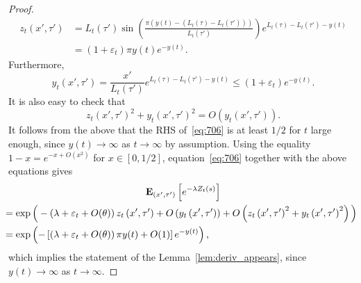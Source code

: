 \documentclass[AHL,Unicode,longabstracts,published]{cedram}
\newcommand*\eps{\varepsilon}
\newcommand*\E{\mathbf{E}}
\newcommand{\1} {\mathds{1}}
\renewcommand*\to{\rightarrow}
\begin{document}
\begin{proof}
\begin{align*}
z_t(x',\tau') &= L_t(\tau') \sin\left(\frac{\pi (y(t) - (L_t(\tau) - L_t(\tau')))}{L_t(\tau')}\right) e^{L_t(\tau) - L_t(\tau') - y(t)} \\
&= (1+\eps_t)\pi y(t)e^{-y(t)}.
\end{align*}
Furthermore,
\[
y_t\left(x',\tau'\right) = \frac{x'}{L_t(\tau')} e^{L_t(\tau) - L_t(\tau') - y(t)} \le (1 + \eps_t) e^{-y(t)}.
\]
It is also easy to check that
\[
z_t\left(x',\tau'\right)^2 + y_t\left(x',\tau'\right)^2 = O\left(y_t\left(x',\tau'\right)\right).
\]
It follows from the above that the RHS of~\eqref{eq:706} is at least $1/2$ for $t$ large enough, since $y(t) \to\infty$ as $t\to\infty$ by assumption. Using the equality $1-x = e^{-x + O(x^2)}$ for $x\in [0,1/2]$, equation~\eqref{eq:706} together with the above equations gives
\begin{multline}
\E_{\left(x',\tau'\right)}\left[e^{-\lambda Z_t(s)}\right]\\
\mkern-15mu\begin{aligned}
&= \exp\Big(-\left(\lambda +\eps_t+O(\theta)\right) z_t\left(x',\tau'\right) 
 + O\left(y_t\left(x',\tau'\right)\right) + O\left(z_t\left(x',\tau'\right)^2+y_t\left(x',\tau'\right)^2\right)\Big)\\
&= \exp\left(-\left[\left(\lambda +\eps_t+O(\theta)\right) \pi y(t) + O(1)\right]e^{-y(t)}\right),
\end{aligned}
\end{multline}
which implies the statement of the Lemma~\ref{lem:deriv_appears}, since $y(t)\to\infty$ as $t\to\infty$.
\end{proof}
\end{document}
